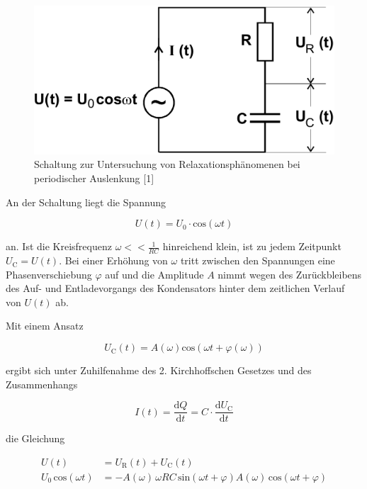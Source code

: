 \begin{figure}
\centering
\includegraphics[scale=0.2]{content/sch_per.png}
\caption{Schaltung zur Untersuchung von Relaxationsphänomenen bei periodischer Auslenkung [1]}
\label{fig:sch_per}
\end{figure}

An der Schaltung liegt die Spannung

\begin{equation}
    U(t) = U_0 \cdot \text{cos}(\omega t)
\end{equation}

an. Ist die Kreisfrequenz $\omega << \frac{1}{RC}$ hinreichend klein, ist zu jedem Zeitpunkt
$U_\text{C} = U(t)$. Bei einer Erhöhung von $\omega$ tritt zwischen den Spannungen eine
Phasenverschiebung $\varphi$ auf und die Amplitude $A$ nimmt wegen des Zurückbleibens des
Auf- und Entladevorgangs des Kondensators hinter dem zeitlichen Verlauf von $U(t)$ ab. 

Mit einem Ansatz

\begin{equation*} 
    U_\text{C}(t) = A(\omega) \text{cos}(\omega t + \varphi(\omega))
\end{equation*}

ergibt sich unter Zuhilfenahme des 2. Kirchhoffschen Gesetzes und des Zusammenhangs

\begin{equation}
    \label{eqn:Stromstaerke}
    I(t) = \frac{\text{d}Q}{\text{d}t} = C \cdot \frac{\text{d}U_\text{C}}{\text{d}t}
\end{equation}

die Gleichung

\begin{equation}
    \label{eqn:Stromkreis}
    \begin{split}
        U(t) &= U_\text{R}(t) + U_\text{C}(t) \\
        U_0 \, \text{cos}(\omega t) &= -A(\omega) \, \omega RC \, \text{sin}(\omega t + \varphi)
        A(\omega) \, \text{cos}(\omega t + \varphi) 
    \end{split}
\end{equation}

